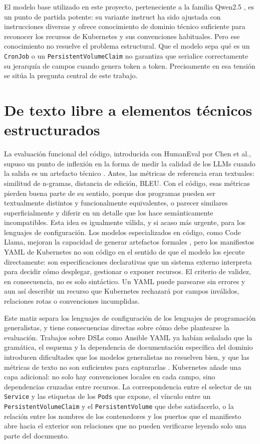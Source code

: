 El modelo base utilizado en este proyecto, perteneciente a la familia Qwen2.5 \citep{qwen2024qwen25}, es un punto de partida potente: su variante instruct ha sido ajustada con instrucciones diversas y ofrece conocimiento de dominio técnico suficiente para reconocer los recursos de Kubernetes y sus convenciones habituales. Pero ese conocimiento no resuelve el problema estructural. Que el modelo sepa qué es un \texttt{CronJob} o un \texttt{PersistentVolumeClaim} no garantiza que serialice correctamente su jerarquía de campos cuando genera token a token. Precisamente en esa tensión se sitúa la pregunta central de este trabajo.

\section{De texto libre a elementos técnicos estructurados}
\label{sec:estado-arte-artefactos-tecnicos}

La evaluación funcional del código, introducida con HumanEval por Chen et al., supuso un punto de inflexión en la forma de medir la calidad de los LLMs cuando la salida es un artefacto técnico \citep{chen2021evaluating}. Antes, las métricas de referencia eran textuales: similitud de n-gramas, distancia de edición, BLEU. Con el código, esas métricas pierden buena parte de su sentido, porque dos programas pueden ser textualmente distintos y funcionalmente equivalentes, o parecer similares superficialmente y diferir en un detalle que los hace semánticamente incompatibles. Esta idea es igualmente válida, y si acaso más urgente, para los lenguajes de configuración. Los modelos especializados en código, como Code Llama, mejoran la capacidad de generar artefactos formales \citep{roziere2023codellama}, pero los manifiestos YAML de Kubernetes no son código en el sentido de que el modelo los ejecute directamente: son especificaciones declarativas que un sistema externo interpreta para decidir cómo desplegar, gestionar o exponer recursos. El criterio de validez, en consecuencia, no es solo sintáctico. Un YAML puede parsearse sin errores y aun así describir un recurso que Kubernetes rechazará por campos inválidos, relaciones rotas o convenciones incumplidas.

Este matiz separa los lenguajes de configuración de los lenguajes de programación generalistas, y tiene consecuencias directas sobre cómo debe plantearse la evaluación. Trabajos sobre DSLs como Ansible YAML ya habían señalado que la gramática, el esquema y la dependencia de documentación específica del dominio introducen dificultades que los modelos generalistas no resuelven bien, y que las métricas de texto no son suficientes para capturarlas \citep{pimparkhede2024doccgen, pujar2023automatedyaml}. Kubernetes añade una capa adicional: no solo hay convenciones locales en cada campo, sino dependencias cruzadas entre recursos. La correspondencia entre el selector de un \texttt{Service} y las etiquetas de los \texttt{Pods} que expone, el vínculo entre un \texttt{PersistentVolumeClaim} y el \texttt{PersistentVolume} que debe satisfacerlo, o la relación entre los nombres de los contenedores y los puertos que el manifiesto abre hacia el exterior son relaciones que no pueden verificarse leyendo solo una parte del documento.

